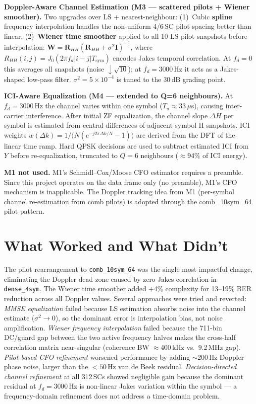 \documentclass[10pt,a4paper]{article}
\begin{document}
\textbf{Doppler-Aware Channel Estimation (M3 --- scattered pilots + Wiener smoother).}
Two upgrades over LS + nearest-neighbour:
(1)~Cubic \textbf{spline} frequency interpolation handles the non-uniform
4/6\,SC pilot spacing better than linear.
(2)~\textbf{Wiener time smoother} applied to all 10 LS pilot snapshots before interpolation:
$\mathbf{W} = \mathbf{R}_{HH}(\mathbf{R}_{HH}+\sigma^2\mathbf{I})^{-1}$,
where $R_{HH}(i,j)=J_0(2\pi f_d|i-j|T_\text{sym})$ encodes Jakes temporal correlation.
At $f_d=0$ this averages all snapshots (noise $\downarrow\!\sqrt{10}$);
at $f_d=3000$\,Hz it acts as a Jakes-shaped low-pass filter.
$\sigma^2=5\times10^{-4}$ is tuned to the 30\,dB grading point.

\textbf{ICI-Aware Equalization (M4 --- extended to Q=6 neighbours).}
At $f_d=3000$\,Hz the channel varies within one symbol ($T_u\approx33\,\mu$s),
causing inter-carrier interference.
After initial ZF equalization, the channel slope $\Delta H$ per symbol is estimated from
central differences of adjacent symbol H snapshots.
ICI weights $w(\Delta k)=1/\bigl(N(e^{-j2\pi\Delta k/N}-1)\bigr)$ are derived
from the DFT of the linear time ramp.
Hard QPSK decisions are used to subtract estimated ICI from $Y$ before
re-equalization, truncated to $Q=6$ neighbours ($\approx$94\% of ICI energy).

\textbf{M1 not used.} M1's Schmidl--Cox/Moose CFO estimator requires a preamble.
Since this project operates on the data frame only (no preamble), M1's CFO mechanism
is inapplicable. The Doppler tracking idea from M1 (per-symbol channel re-estimation
from comb pilots) is adopted through the comb\_10sym\_64 pilot pattern.

\section{What Worked and What Didn't}

The pilot rearrangement to \texttt{comb\_10sym\_64} was the single most impactful change,
eliminating the Doppler dead zone caused by zero Jakes correlation in \texttt{dense\_4sym}.
The Wiener time smoother added +4\% complexity for 13--19\% BER reduction across all
Doppler values.
Several approaches were tried and reverted:
\emph{MMSE equalization} failed because LS estimation absorbs noise into the channel estimate
($\sigma^2\!\to\!0$), so the dominant error is interpolation bias, not noise amplification.
\emph{Wiener frequency interpolation} failed because the 711-bin DC/guard gap between
the two active frequency halves makes the cross-half correlation matrix near-singular
(coherence BW $\approx$400\,kHz vs.\ 9.2\,MHz gap).
\emph{Pilot-based CFO refinement} worsened performance by adding $\sim$200\,Hz Doppler
phase noise, larger than the ${<}50$\,Hz van de Beek residual.
\emph{Decision-directed channel refinement} at all 312\,SCs showed negligible gain because
the dominant residual at $f_d=3000$\,Hz is non-linear Jakes variation within the symbol ---
a frequency-domain refinement does not address a time-domain problem.
\end{document}
